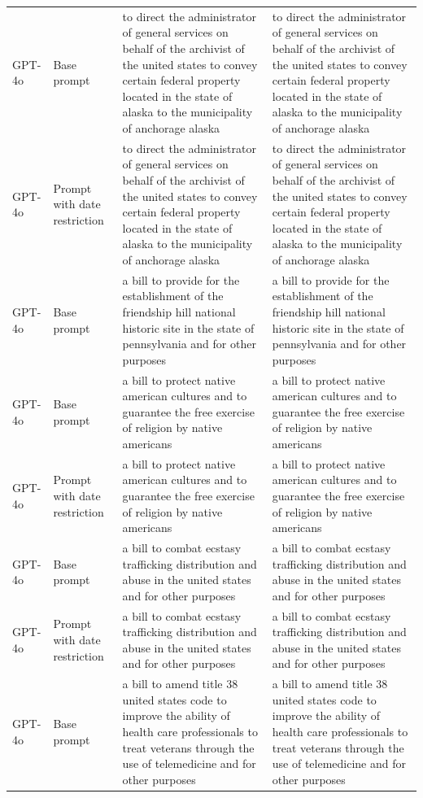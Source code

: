 \begin{longtable}{>{\raggedright\arraybackslash}p{1.4cm}>{\raggedright\arraybackslash}p{1.4cm}>{\raggedright\arraybackslash}p{5.5cm}>{\raggedright\arraybackslash}p{5.5cm}}
GPT-4o & Base prompt & to direct the administrator of general services on behalf of the archivist of the united states to convey certain federal property located in the state of alaska to the municipality of anchorage alaska & to direct the administrator of general services on behalf of the archivist of the united states to convey certain federal property located in the state of alaska to the municipality of anchorage alaska\\
GPT-4o & Prompt with date restriction & to direct the administrator of general services on behalf of the archivist of the united states to convey certain federal property located in the state of alaska to the municipality of anchorage alaska & to direct the administrator of general services on behalf of the archivist of the united states to convey certain federal property located in the state of alaska to the municipality of anchorage alaska\\
GPT-4o & Base prompt & a bill to provide for the establishment of the friendship hill national historic site in the state of pennsylvania and for other purposes & a bill to provide for the establishment of the friendship hill national historic site in the state of pennsylvania and for other purposes\\
GPT-4o & Base prompt & a bill to protect native american cultures and to guarantee the free exercise of religion by native americans & a bill to protect native american cultures and to guarantee the free exercise of religion by native americans\\
GPT-4o & Prompt with date restriction & a bill to protect native american cultures and to guarantee the free exercise of religion by native americans & a bill to protect native american cultures and to guarantee the free exercise of religion by native americans\\
GPT-4o & Base prompt & a bill to combat ecstasy trafficking distribution and abuse in the united states and for other purposes & a bill to combat ecstasy trafficking distribution and abuse in the united states and for other purposes\\
GPT-4o & Prompt with date restriction & a bill to combat ecstasy trafficking distribution and abuse in the united states and for other purposes & a bill to combat ecstasy trafficking distribution and abuse in the united states and for other purposes\\
GPT-4o & Base prompt & a bill to amend title 38 united states code to improve the ability of health care professionals to treat veterans through the use of telemedicine and for other purposes & a bill to amend title 38 united states code to improve the ability of health care professionals to treat veterans through the use of telemedicine and for other purposes\\

\end{longtable}
